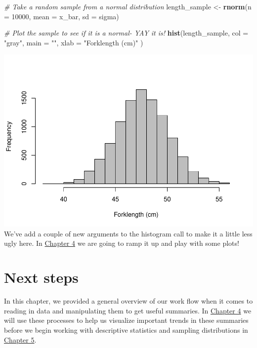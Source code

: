 \documentclass[
]{book}
\newenvironment{Shaded}{\begin{snugshade}}{\end{snugshade}}
\newcommand{\CommentTok}[1]{\textcolor[rgb]{0.56,0.35,0.01}{\textit{#1}}}
\newcommand{\DataTypeTok}[1]{\textcolor[rgb]{0.13,0.29,0.53}{#1}}
\newcommand{\DecValTok}[1]{\textcolor[rgb]{0.00,0.00,0.81}{#1}}
\newcommand{\KeywordTok}[1]{\textcolor[rgb]{0.13,0.29,0.53}{\textbf{#1}}}
\newcommand{\NormalTok}[1]{#1}
\newcommand{\StringTok}[1]{\textcolor[rgb]{0.31,0.60,0.02}{#1}}
\begin{document}
\begin{Shaded}
\begin{Highlighting}[]
\CommentTok{# Take a random sample from a normal distribution}
\NormalTok{length_sample <-}\StringTok{ }\KeywordTok{rnorm}\NormalTok{(}\DataTypeTok{n =} \DecValTok{10000}\NormalTok{, }\DataTypeTok{mean =}\NormalTok{ x_bar, }\DataTypeTok{sd =}\NormalTok{ sigma)}

\CommentTok{# Plot the sample to see if it is a normal- YAY it is!}
\KeywordTok{hist}\NormalTok{(length_sample,}
  \DataTypeTok{col =} \StringTok{"gray"}\NormalTok{,}
  \DataTypeTok{main =} \StringTok{""}\NormalTok{,}
  \DataTypeTok{xlab =} \StringTok{"Forklength (cm)"}
\NormalTok{)}
\end{Highlighting}
\end{Shaded}

\includegraphics{worstr_files/figure-latex/unnamed-chunk-83-1.pdf}
We've add a couple of new arguments to the histogram call to make it a little less ugly here. In \protect\hyperlink{Chapter4}{Chapter 4} we are going to ramp it up and play with some plots!

\hypertarget{next3}{%
\section{Next steps}\label{next3}}

In this chapter, we provided a general overview of our work flow when it comes to reading in data and manipulating them to get useful summaries. In \protect\hyperlink{Chapter4}{Chapter 4} we will use these processes to help us visualize important trends in these summaries before we begin working with descriptive statistics and sampling distributions in \protect\hyperlink{Chapter5}{Chapter 5}.
\end{document}
